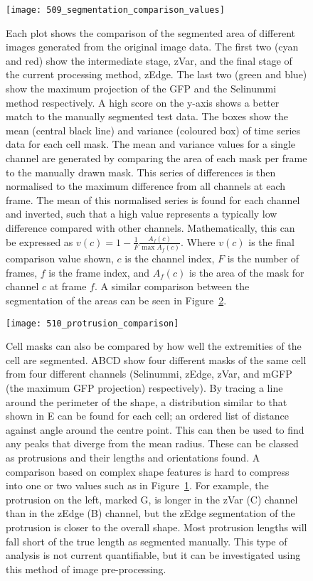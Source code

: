\begin{figure}[h!]
 \centering
 \texttt{[image: 509\_segmentation\_comparison\_values]}
 \caption[Testing: segmentation area comparison values]{
	Each plot shows the comparison of the segmented area of different images generated from the original image data. The first two (cyan and red) show the intermediate stage, zVar, and the final stage of the current processing method, zEdge. The last two (green and blue) show the maximum projection of the GFP and the Selinummi method respectively. A high score on the y-axis shows a better match to the manually segmented test data. The boxes show the mean (central black line) and variance (coloured box) of time series data for each cell mask. The mean and variance values for a single channel are generated by comparing the area of each mask per frame to the manually drawn mask. This series of differences is then normalised to the maximum difference from all channels at each frame. The mean of this normalised series is found for each channel and inverted, such that a high value represents a typically low difference compared with other channels. Mathematically, this can be expressed as $v(c) = 1 - \frac{1}{F} \frac{A_f(c)}{\max A_f(c)}$. Where $v(c)$ is the final comparison value shown, $c$ is the channel index, $F$ is the number of frames, $f$ is the frame index, and $A_f(c)$ is the area of the mask for channel $c$ at frame $f$. A similar comparison between the segmentation of the areas can be seen in Figure~\ref{fig:protrusioncomparison}.
 }
 \label{fig:areacomparisonvalues}
\end{figure}

\begin{figure}[h!]
 \centering
 \texttt{[image: 510\_protrusion\_comparison]}
 \caption[Testing: protrusion comparison]{
	Cell masks can also be compared by how well the extremities of the cell are segmented. ABCD show four different masks of the same cell from four different channels (Selinummi, zEdge, zVar, and mGFP (the maximum GFP projection) respectively). By tracing a line around the perimeter of the shape, a distribution similar to that shown in E can be found for each cell; an ordered list of distance against angle around the centre point. This can then be used to find any peaks that diverge from the mean radius. These can be classed as protrusions and their lengths and orientations found. A comparison based on complex shape features is hard to compress into one or two values such as in Figure~\ref{fig:areacomparisonvalues}. For example, the protrusion on the left, marked G, is longer in the zVar (C) channel than in the zEdge (B) channel, but the zEdge segmentation of the protrusion is closer to the overall shape. Most protrusion lengths will fall short of the true length as segmented manually. This type of analysis is not current quantifiable, but it can be investigated using this method of image pre-processing.
 }
 \label{fig:protrusioncomparison}
\end{figure}


